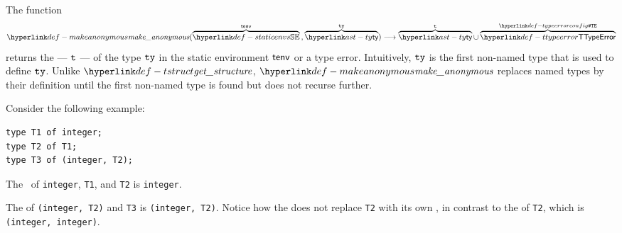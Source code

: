 \FormallyParagraph
{}

\hypertarget{def-makeanonymous}{}
\hypertarget{def-underlyingtype}{}
The function
\[
  \makeanonymous(\overname{\staticenvs}{\tenv} \aslsep \overname{\ty}{\tty}) \aslto \overname{\ty}{\vt} \cup \overname{\TTypeError}{\TypeErrorConfig}
\]
returns the \emph{\underlyingtype} --- $\texttt{t}$ --- of the type $\texttt{ty}$ in the static environment $\textsf{tenv}$ or a type error.
Intuitively, $\texttt{ty}$ is the first non-named type that is used to define $\texttt{ty}$. Unlike $\tstruct$,
$\makeanonymous$ replaces named types by their definition until the first non-named type is found but
does not recurse further.

Consider the following example:
\begin{lstlisting}
type T1 of integer;
type T2 of T1;
type T3 of (integer, T2);
\end{lstlisting}

The \underlyingtypes\ of \texttt{integer}, \texttt{T1}, and \texttt{T2} is \texttt{integer}.

The \underlyingtype{} of \texttt{(integer, T2)} and \texttt{T3} is
\texttt{(integer, T2)}.  Notice how the \underlyingtype{} does not replace
\texttt{T2} with its own \underlyingtype, in contrast to the \structure{} of
\texttt{T2}, which is \texttt{(integer, integer)}.

